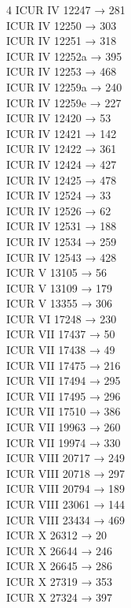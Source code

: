 \begin{multicols}{4}
ICUR IV 12247 → 281\\
ICUR IV 12250 → 303\\
ICUR IV 12251 → 318\\
ICUR IV 12252a → 395\\
ICUR IV 12253 → 468\\
ICUR IV 12259a → 240\\
ICUR IV 12259e → 227\\
ICUR IV 12420 → 53\\
ICUR IV 12421 → 142\\
ICUR IV 12422 → 361\\
ICUR IV 12424 → 427\\
ICUR IV 12425 → 478\\
ICUR IV 12524 → 33\\
ICUR IV 12526 → 62\\
ICUR IV 12531 → 188\\
ICUR IV 12534 → 259\\
ICUR IV 12543 → 428\\
ICUR V 13105 → 56\\
ICUR V 13109 → 179\\
ICUR V 13355 → 306\\
ICUR VI 17248 → 230\\
ICUR VII 17437 → 50\\
ICUR VII 17438 → 49\\
ICUR VII 17475 → 216\\
ICUR VII 17494 → 295\\
ICUR VII 17495 → 296\\
ICUR VII 17510 → 386\\
ICUR VII 19963 → 260\\
ICUR VII 19974 → 330\\
ICUR VIII 20717 → 249\\
ICUR VIII 20718 → 297\\
ICUR VIII 20794 → 189\\
ICUR VIII 23061 → 144\\
ICUR VIII 23434 → 469\\
ICUR X 26312 → 20\\
ICUR X 26644 → 246\\
ICUR X 26645 → 286\\
ICUR X 27319 → 353\\
ICUR X 27324 → 397\end{multicols}
